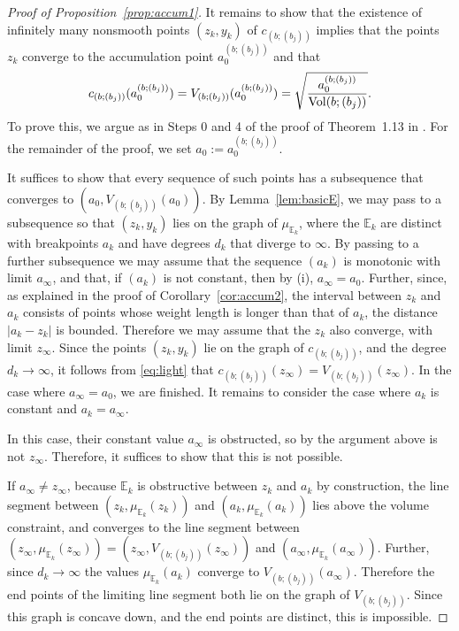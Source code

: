 \documentclass[11pt, reqno]{amsart}
\theoremstyle{remark}
\numberwithin{equation}{subsection}
\numberwithin{figure}{section}
\theoremstyle{customremark}
\newcommand{\Vol}{{\rm Vol}}
\newcommand{\bE}{{\mathbb E}}
\begin{document}
\begin{proof}[Proof of Proposition~\ref{prop:accum1}]
It remains to show that the existence of infinitely many nonsmooth points $(z_k, y_k)$ of $c_{(b;(b_j))}$ implies that
the points $z_k$ converge to the accumulation point $a^{(b;(b_j))}_0$ and that
$$
c_{(b;(b_j))}(a^{(b;(b_j))}_0) = V_{(b;(b_j))}(a^{(b;(b_j))}_0) =\sqrt {\frac{a^{(b;(b_j))}_0}{\Vol(b;(b_j))}}.
$$
  To prove this, we  argue as in Steps 0 and 4 of the proof of Theorem~1.13 in \cite[\S4]{AADT}. For the remainder of the proof, we set $a_0:=a^{(b;(b_j))}_0$. 
 

  It suffices to show that every sequence of such points has a subsequence that converges to $(a_0, V_{(b;(b_j))}(a_0))$.  
 By Lemma~\ref{lem:basicE}, we may pass to a subsequence so
 that  $(z_k, y_k)$  lies on the graph of $\mu_{\bE_k}$, where the $\bE_k$ are distinct with breakpoints $a_k$  and have degrees $d_k$ that diverge to $\infty$. 
 By passing to a further subsequence 
  we may assume that  the sequence %
   $(a_k)$ is monotonic with limit $a_\infty$, and that, if $(a_k)$ is not constant, then by (i), $a_\infty = a_0$.
    Further, since, as explained in the proof of Corollary~\ref{cor:accum2},  the interval between $z_k$ and $a_k$ consists of points whose weight length is longer than that of $a_k$,
   the distance $|a_k-z_k|$ is bounded. Therefore 
 we may assume that the $z_k$ also converge, with limit $z_\infty$.  Since the points $(z_k,y_k)$ lie on the graph of $c_{(b;(b_j))}$, and the degree $d_k\to \infty$, it follows from \eqref{eq:light} that $c_{(b;(b_j))}(z_\infty) = V_{(b;(b_j))}(z_\infty)$. In the case where $a_\infty=a_0$, we are finished. It remains to consider the case where $a_k$ is constant and $a_k=a_\infty$.
 
  In this case, their constant value $a_\infty$ is obstructed, so by the argument above is not $z_\infty$.  Therefore, it suffices to show that  this is not possible. 
 
 If $a_\infty\ne z_\infty$, because $\bE_k$ is obstructive between $z_k$ and $a_k$ by construction, 
  the line segment between $(z_k,\mu_{\bE_k}(z_k))$ and  $(a_k,\mu_{\bE_k}(a_k))$ lies above the volume constraint, and converges to
  the line segment between  $(z_\infty,\mu_{\bE_k}(z_\infty)) = (z_\infty, V_{(b;(b_j))}(z_\infty))$ and $(a_\infty,\mu_{\bE_k}(a_\infty))$.
  Further, since $d_k\to \infty$ the values $\mu_{\bE_k}(a_k)$ converge to $V_{(b;(b_j))}(a_\infty)$.
  Therefore the end points of the limiting line segment both  lie on the graph of $V_{(b;(b_j))}$.
  Since this graph is concave down, and the end points are distinct, this is impossible.
\end{proof} 
\end{document}
